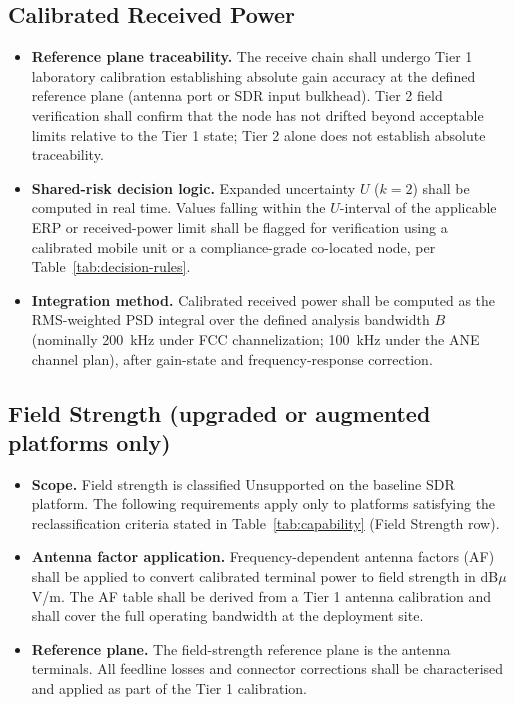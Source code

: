 \documentclass[11pt]{article}
\begin{document}
\subsection*{Calibrated Received Power}

\begin{itemize}
    \item \textbf{Reference plane traceability.} The receive chain shall undergo Tier 1 laboratory calibration establishing absolute gain accuracy at the defined reference plane (antenna port or SDR input bulkhead). Tier 2 field verification shall confirm that the node has not drifted beyond acceptable limits relative to the Tier 1 state; Tier 2 alone does not establish absolute traceability.
    \item \textbf{Shared-risk decision logic.} Expanded uncertainty $U$ ($k=2$) shall be computed in real time. Values falling within the $U$-interval of the applicable ERP or received-power limit shall be flagged for verification using a calibrated mobile unit or a compliance-grade co-located node, per Table~\ref{tab:decision-rules}.
    \item \textbf{Integration method.} Calibrated received power shall be computed as the RMS-weighted PSD integral over the defined analysis bandwidth $B$ (nominally 200~kHz under FCC channelization; 100~kHz under the ANE channel plan), after gain-state and frequency-response correction.
\end{itemize}

\subsection*{Field Strength (upgraded or augmented platforms only)}

\begin{itemize}
    \item \textbf{Scope.} Field strength is classified Unsupported on the baseline SDR platform. The following requirements apply only to platforms satisfying the reclassification criteria stated in Table~\ref{tab:capability} (Field Strength row).
    \item \textbf{Antenna factor application.} Frequency-dependent antenna factors (AF) shall be applied to convert calibrated terminal power to field strength in dB$\mu$V/m. The AF table shall be derived from a Tier 1 antenna calibration and shall cover the full operating bandwidth at the deployment site.
    \item \textbf{Reference plane.} The field-strength reference plane is the antenna terminals. All feedline losses and connector corrections shall be characterised and applied as part of the Tier 1 calibration.
\end{itemize}
\end{document}

